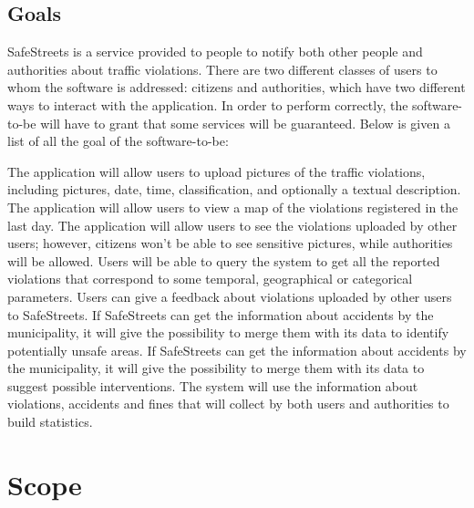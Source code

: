 \documentclass[../RASD.tex]{subfiles}
\begin{document}
    \subsection{Goals}\label{subsec:goals}
        SafeStreets is a service provided to people to notify both other people and authorities about traffic violations.
        There are two different classes of users to whom the software is addressed: citizens and authorities, which have two different ways to interact with the application.
        In order to perform correctly, the software-to-be will have to grant that some services will be guaranteed.
        Below is given a list of all the goal of the software-to-be:
        \begin{enumerate}
             The application will allow users to upload pictures of the traffic violations, including pictures, date, time, classification, and optionally a textual description.
             The application will allow users to view a map of the violations registered in the last day.
             The application will allow users to see the violations uploaded by other users;
            however, citizens won’t be able to see sensitive pictures, while authorities will be allowed.
             Users will be able to query the system to get all the reported violations that correspond to some temporal, geographical or categorical parameters.
             Users can give a feedback about violations uploaded by other users to SafeStreets.
             If SafeStreets can get the information about accidents by the municipality, it will give the possibility to merge them with its data to identify potentially unsafe areas.
            If SafeStreets can get the information about accidents by the municipality, it will give the possibility to merge them with its data to suggest possible interventions.
            The system will use the information about violations, accidents and fines that will collect by both users and authorities to build statistics.
        \end{enumerate}
    \newpage
    \section{Scope}\label{sec:scope}
\end{document}
